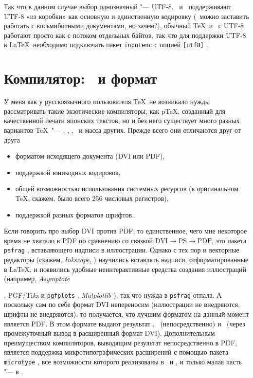 \documentclass[a4paper,12pt,hyphens]{article}
\newcommand\softname[1]{\textit{#1}}
\newcommand\package[1]{\texttt{#1}}
\newcommand\lcmd[1]{\texttt{#1}}
\begin{document}
Так что в данном случае выбор однозначный "--- UTF-8. \LuaTeX\ и \XeTeX\ поддерживают
UTF-8 «из коробки» как основную и единственную кодировку (\LuaLaTeX\ можно
заставить работать с восьмибитными документами, но зачем?), обычный \TeX\
и \pdfTeX\ с UTF-8 работают просто как с потоком отдельных байтов, так что
для поддержки UTF-8 в \LaTeX\ необходимо подключать пакет \package{inputenc}
с опцией \lcmd{[utf8]} \parencite{ctan-inputenc}.

\section{Компилятор: \LuaTeX\ и формат \LuaLaTeX}
У меня как у русскоязычного пользователя \TeX\ не возникало нужды рассматривать
такие экзотические компиляторы, как p\TeX, созданный для качественной печати японских
текстов, но и без него существует много разных вариантов \TeX\ "--- \eTeX, \pdfTeX,
\XeTeX, \LuaTeX\ и масса других. Прежде всего они отличаются
друг от друга
\begin{itemize}
\item форматом исходящего документа (DVI или PDF),
\item поддержкой юникодных кодировок,
\item общей возможностью использования системных ресурсов (в оригинальном \TeX,
скажем, было всего 256 числовых регистров),
\item поддержкой разных форматов шрифтов.
\end{itemize}

Если говорить про выбор DVI против PDF, то единственное, чего мне некоторое время
не хватало в PDF по сравнению со связкой $\text{DVI}\to\text{PS}\to\text{PDF}$,
это пакета \package{psfrag} \parencite{ctan-psfrag}, вставляющего надписи в иллюстрации. Однако с тех
пор и векторные редакторы (скажем, \softname{Inkscape}, \cite{site-inkscape})
научились вставлять надписи,
отформатированные в \LaTeX, и появились удобные неинтерактивные средства создания
иллюстраций (например, \softname{Asymptote}
\begin{otherlanguage}{english}\parencite{site-asymptote,ctan-asymptote}\end{otherlanguage},
PGF/Ti\emph{k}z \parencite{ctan-pgf} и \package{pgfplots} \parencite{ctan-pgfplots},
\softname{Matplotlib} \parencite{site-matplotlib}), так что нужда в \package{psfrag}
отпала. А поскольку сам по себе формат DVI непереносим (иллюстрации не
внедряются, шрифты не внедряются), то получается, что лучшим форматом на данный
момент является PDF. В этом формате выдают результат \pdfTeX, \LuaTeX\ (непосредственно)
и \XeTeX\ (через промежуточный вывод в расширенный формат DVI).
Дополнительным преимуществом компиляторов, выводящим результат непосредственно в PDF,
является поддержка микротипографических расширений с помощью пакета
\package{microtype} \parencite{ctan-microtype}, все возможности которого реализованы в
\pdfTeX\ и \LuaTeX, и только малая часть "--- в \XeTeX.
\end{document}
